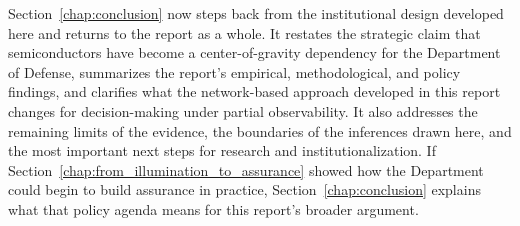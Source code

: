 Section~\ref{chap:conclusion} now steps back from the institutional design developed here and returns to the report as a whole. It restates the strategic claim that semiconductors have become a center-of-gravity dependency for the Department of Defense, summarizes the report's empirical, methodological, and policy findings, and clarifies what the network-based approach developed in this report changes for decision-making under partial observability. It also addresses the remaining limits of the evidence, the boundaries of the inferences drawn here, and the most important next steps for research and institutionalization. If Section~\ref{chap:from_illumination_to_assurance} showed how the Department could begin to build assurance in practice, Section~\ref{chap:conclusion} explains what that policy agenda means for this report's broader argument.